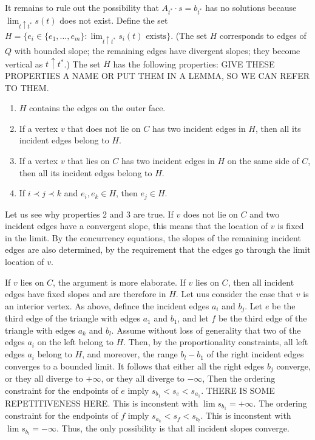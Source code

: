  It remains to rule out the possibility that
 $A_{t^*}\cdot s=b_{t^*}$ has no solutions because
   $\lim_{t\uparrow t^*} s(t)$ does not exist.  Define the set $H=\{e_i\in
   \{e_1,\ldots,e_m\}:\text{$\lim_{t\uparrow t^*} s_i(t)$ exists}\}$.
(The set $H$ corresponds to edges of $Q$
   with
   bounded slope; the remaining edges have divergent slopes; they become vertical as $t\uparrow t^*$.)
The set   $H$ has the following
   properties:
GIVE THESE PROPERTIES A NAME OR PUT THEM IN A LEMMA, SO WE CAN REFER
TO THEM.
   \begin{enumerate}
    \item $H$ contains the edges
      on the outer face.
    \item
If a vertex $v$ that does not lie on $C$ has two incident edges in
$H$,
then all its incident edges belong to $H$.
    \item
If a vertex $v$ that lies on $C$ has two incident edges in
$H$ on the same side of $C$,
then all its incident edges belong to $H$.
    \item If $i \prec j \prec k$ and $e_i,e_k\in H$, 
      then $e_j\in H$.
   \end{enumerate}
Let us see why properties 2 and 3 are true.
If $v$ does not lie on $C$ and two incident edges have a convergent
slope, this means that the location of $v$ is fixed in the limit.
By the concurrency equations, the slopes of the remaining incident
edges are also determined, by the requirement that the edges go through
the limit location of $v$.

If $v$ lies on $C$, the argument is more elaborate. If $v$ lies on
$C$, then all incident edges have fixed slopes and are therefore in
$H$.
Let uus consider the case that $v$ is an interior vertex.
As above, defince the incident edges $a_i$ and $b_j$.
Let $e$ be the third edge of the triangle with edges $a_1$ and $b_1$,
and let 
 $f$ be the third edge of the triangle with edges $a_k$ and $b_l$.
Assume without loss of generality that two of the edges $a_i$ on the
left belong to $H$. Then, by the proportionality constraints, all
left edges $a_i$ belong to $H$, and moreover, the range $b_l-b_1$ of
the right incident edges converges to a bounded limit.
It follows that either all the right edges $b_j$ converge, 
or they all diverge to $+\infty$,
or they all diverge to $-\infty$,
Then the ordering constraint for the endpoints of $e$ imply
\begin{math}
  s_{b_1}<s_e<s_{a_1}
\end{math}.
THERE IS SOME REPETITIVENESS HERE.
This is inconstent with $\lim s_{b_1}=+\infty$.
The ordering constraint for the endpoints of $f$ imply
\begin{math}
  s_{a_k}<s_f<s_{b_l}
\end{math}.
This is inconstent with $\lim s_{b_l}=-\infty$.
Thus, the only possibility is that all incident slopes converge.

